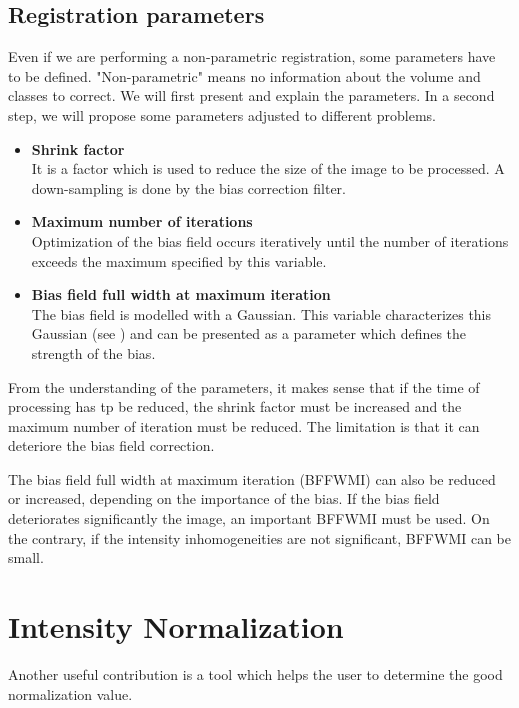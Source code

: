 \subsection{Registration parameters}
Even if we are performing a non-parametric registration, some parameters have to be defined. "Non-parametric" means no information about the volume and classes to correct. We will first present and explain the parameters. In a second step, we will propose some parameters adjusted to different problems.

\begin{itemize}
\item \textbf{Shrink factor}\\
\hspace*{4 mm} It is a factor which is used to reduce the size of the image to be processed. A down-sampling is done by the bias correction filter.

\item \textbf{Maximum number of iterations}\\
\hspace*{4 mm} Optimization of the bias field occurs iteratively until the number of iterations exceeds the maximum specified by this variable.

\item \textbf{Bias field full width at maximum iteration}\\
\hspace*{4 mm} The bias field is modelled with a Gaussian. This variable characterizes this Gaussian (see \cite{20}) and can be presented as a parameter which defines the strength of the bias.
\end{itemize}

\par
From the understanding of the parameters, it makes sense that if the time of processing has tp be reduced, the shrink factor must be increased and the maximum number of iteration must be reduced. The limitation is that it can deteriore the bias field correction.
\par
The bias field full width at maximum iteration (BFFWMI) can also be reduced or increased, depending on the importance of the bias. If the bias field deteriorates significantly the image, an important BFFWMI must be used. On the contrary, if the intensity inhomogeneities are not significant, BFFWMI can be small.
%


\section{Intensity Normalization}\label{intensitynormalizationddd}
Another useful contribution is a tool which helps the user to determine the good normalization value.
